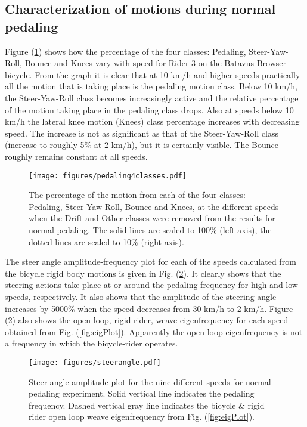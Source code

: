\documentclass[smallextended]{svjour3}     %
\begin{document}
\subsection{Characterization of motions during normal pedaling}
\label{sec:normalPed}
Figure (\ref{jellybean}) shows how the percentage of the four classes:
Pedaling, Steer-Yaw-Roll, Bounce and Knees vary with speed for Rider 3 on the
Batavus Browser bicycle. From the graph it
is clear that at 10 km/h and higher speeds practically all the motion that is
taking place is the pedaling motion class. Below 10 km/h, the Steer-Yaw-Roll
class becomes increasingly active and the relative percentage of the motion
taking place in the pedaling class drops. Also at speeds below 10 km/h the
lateral knee motion (Knees) class percentage increases with decreasing speed.
The increase is not as significant as that of the Steer-Yaw-Roll class
(increase to roughly 5\% at 2 km/h), but it is certainly visible. The Bounce
roughly remains constant at all speeds.
\begin{figure}[tbp]
    \centering
    \texttt{[image: figures/pedaling4classes.pdf]}
    \caption{The percentage of the motion from each of the four classes:
    Pedaling, Steer-Yaw-Roll, Bounce and Knees, at the different speeds when
    the Drift and Other classes were removed from the results for normal
    pedaling. The solid lines are scaled to 100\% (left axis), the dotted lines
    are scaled to 10\% (right axis).}
    \label{jellybean}
\end{figure}
The steer angle amplitude-frequency plot for each of the speeds calculated from
the bicycle rigid body motions is given in Fig. (\ref{pedalsteerangle}). It
clearly shows that the steering actions take place at or around the pedaling
frequency for high and low speeds, respectively. It also shows that the amplitude of the
steering angle increases by 5000\% when the speed decreases from 30 km/h to 2
km/h. Figure (\ref{pedalsteerangle}) also shows the open loop, rigid rider,
weave eigenfrequency for each speed obtained from Fig. (\ref{fig:eigPlot}).
Apparently the open loop eigenfrequency is not a frequency in which the
bicycle-rider operates.
\begin{figure}[tb]
    \centering
        \texttt{[image: figures/steerangle.pdf]}\\
    \caption{Steer angle amplitude plot for the nine different speeds for
    normal pedaling experiment. Solid vertical line indicates the pedaling
    frequency. Dashed vertical gray line indicates the bicycle \& rigid rider
    open loop weave eigenfrequency from Fig. (\ref{fig:eigPlot}).}
    \label{pedalsteerangle}
\end{figure}
\end{document}
